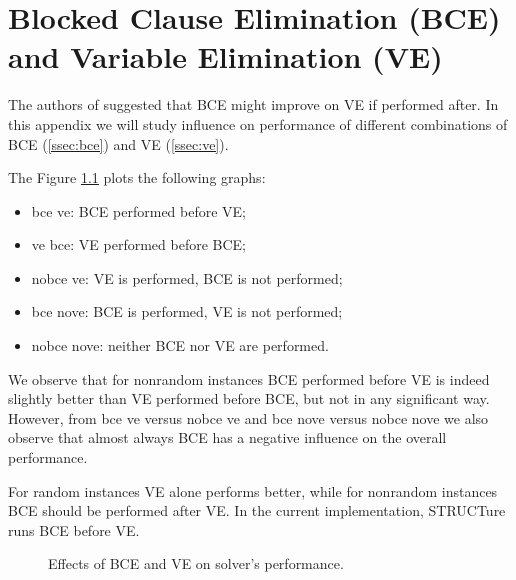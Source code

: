 \chapter{Blocked Clause Elimination (BCE) and Variable Elimination (VE)}
\label{chap:bce-ve}

The authors of \cite{Jarvisalo_blockedclause} suggested that BCE
might improve on VE if performed after. In this appendix we will
study influence on performance of different combinations of BCE
(\ref{ssec:bce}) and VE (\ref{ssec:ve}).

The Figure \ref{fig:bce-ve} plots the following graphs:
\begin{itemize}
  \item \textsf{bce ve}: BCE performed before VE;
  \item \textsf{ve bce}: VE performed before BCE;
  \item \textsf{nobce ve}: VE is performed, BCE is not performed;
  \item \textsf{bce nove}: BCE is performed, VE is not performed;
  \item \textsf{nobce nove}: neither BCE nor VE are performed.
\end{itemize}

We observe that for nonrandom instances BCE performed before VE
is indeed slightly better than VE performed before BCE, but not
in any significant way.  However, from \textsf{bce ve} versus
\textsf{nobce ve} and \textsf{bce nove} versus \textsf{nobce nove}
we also observe that almost always BCE has a negative influence on
the overall performance.

For random instances VE alone performs better, while for
nonrandom instances BCE should be performed after VE. In the current
implementation, STRUCTure runs BCE before VE.

\begin{figure}
  \centering
  \caption{Effects of BCE and VE on solver's performance.}
  \label{fig:bce-ve}
\end{figure}
